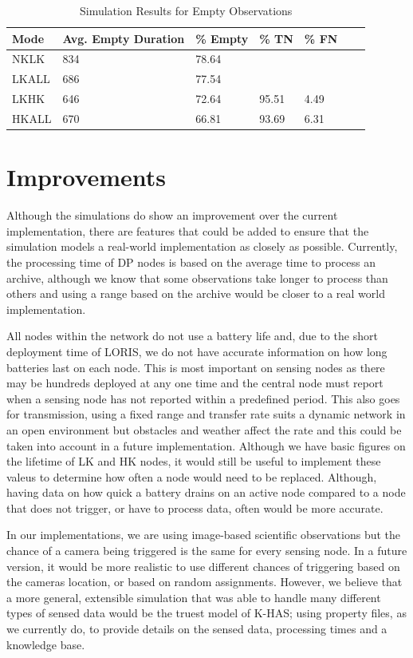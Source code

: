 \begin{table}[h]\footnotesize
\begin{tabularx}{\textwidth}{ |X|X|X|X|X|X|X| }
\hline
Mode & Avg. Empty Duration & \% Empty & \% TN & \% FN \\
\hline
NKLK & 834 & 78.64 & &  \\
LKALL & 686 & 77.54 & & \\
LKHK & 646 & 72.64 & 95.51 & 4.49 \\
HKALL & 670 & 66.81 & 93.69 & 6.31 \\
\hline
\end{tabularx}
\caption{Simulation Results for Empty Observations}\label{tab:observ_empty}
\end{table}
	
\section{Improvements}
Although the simulations do show an improvement over the current implementation, there are features that could be added to ensure that the simulation models a real-world implementation as closely as possible. Currently, the processing time of DP nodes is based on the average time to process an archive, although we know that some observations take longer to process than others and using a range based on the archive would be closer to a real world implementation.

All nodes within the network do not use a battery life and, due to the short deployment time of LORIS, we do not have accurate information on how long batteries last on each node. This is most important on sensing nodes as there may be hundreds deployed at any one time and the central node must report when a sensing node has not reported within a predefined period. This also goes for transmission, using a fixed range and transfer rate suits a dynamic network in an open environment but obstacles and weather affect the rate and this could be taken into account in a future implementation. Although we have basic figures on the lifetime of LK and HK nodes, it would still be useful to implement these valeus to determine how often a node would need to be replaced. Although, having data on how quick a battery drains on an active node compared to a node that does not trigger, or have to process data, often would be more accurate.

In our implementations, we are using image-based scientific observations but the chance of a camera being triggered is the same for every sensing node. In a future version, it would be more realistic to use different chances of triggering based on the cameras location, or based on random assignments. However, we believe that a more general, extensible simulation that was able to handle many different types of sensed data would be the truest model of K-HAS; using property files, as we currently do, to provide details on the sensed data, processing times and a knowledge base.

